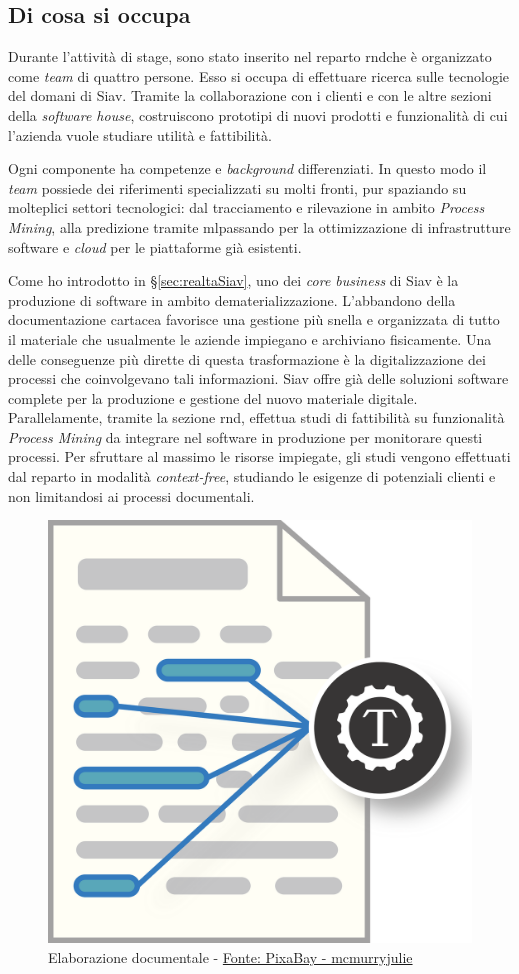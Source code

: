 \subsection{Di cosa si occupa}
\label{subsec:occupazioneRnd}
Durante l'attività di stage, sono stato inserito nel reparto \acrshort{rnd}\glsfirstoccur che è organizzato come \textit{team} di quattro persone. Esso si occupa di effettuare ricerca sulle tecnologie del domani di Siav. Tramite la collaborazione con i clienti e con le altre sezioni della \textit{software house}, costruiscono prototipi di nuovi prodotti e funzionalità di cui l'azienda vuole studiare utilità e fattibilità.

Ogni componente ha competenze e \textit{background} differenziati. In questo modo il \textit{team} possiede dei riferimenti specializzati su molti fronti, pur spaziando su molteplici settori tecnologici: dal tracciamento e rilevazione in ambito \textit{Process Mining}, alla predizione tramite \acrlong{ml}\glsfirstoccur passando per la ottimizzazione di infrastrutture software e \textit{cloud} per le piattaforme già esistenti.

Come ho introdotto in \S \ref{sec:realtaSiav}, uno dei \textit{core business} di Siav è la produzione di software in ambito dematerializzazione. L'abbandono della documentazione cartacea favorisce una gestione più snella e organizzata di tutto il materiale che usualmente le aziende impiegano e archiviano fisicamente. Una delle conseguenze più dirette di questa trasformazione è la digitalizzazione dei processi che coinvolgevano tali informazioni. Siav offre già delle soluzioni software complete per la produzione e gestione del nuovo materiale digitale. Parallelamente, tramite la sezione \acrshort{rnd}, effettua studi di fattibilità su funzionalità \textit{Process Mining} da integrare nel software in produzione per monitorare questi processi. Per sfruttare al massimo le risorse impiegate, gli studi vengono effettuati dal reparto in modalità \textit{context-free}, studiando le esigenze di potenziali clienti e non limitandosi ai processi documentali.
\begin{figure}[H] 
    \centering 
    \includegraphics[width=0.45\columnwidth]{immagini/text-mining.png} 
    \caption{Elaborazione documentale - \href{https://pixabay.com/it/users/mcmurryjulie-2375405/?utm_source=link-attribution&amp;utm_medium=referral&amp;utm_campaign=image&amp;utm_content=1476780}{Fonte: PixaBay - mcmurryjulie}}
    \label{fig:elaborazioneDocumentale}
\end{figure}
\newpage
